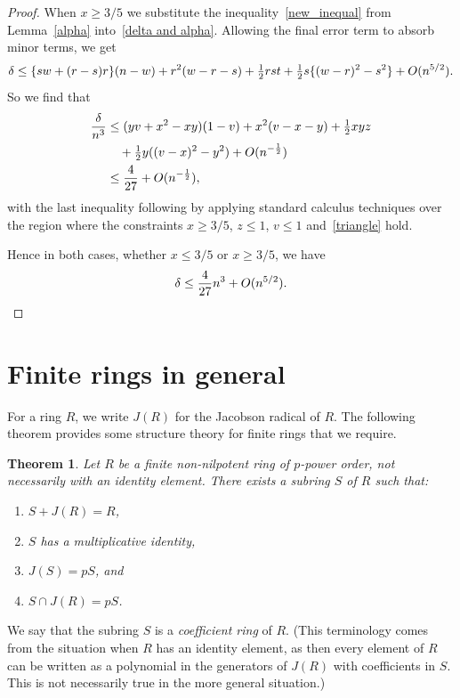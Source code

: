 \documentclass[12pt]{article}
\newtheorem{Thm}{Theorem}[section]
\begin{document}
\begin{proof}
When $x \geq 3/5$ we substitute the inequality~\eqref{new_inequal} from Lemma~\ref{alpha} into~\eqref{delta and alpha}. Allowing the final error term to absorb minor terms, we get
\begin{displaymath}
\delta \leq  \{sw + (r - s)r\}(n - w) + r^{2}(w - r - s) + \tfrac{1}{2}rst + \tfrac{1}{2}s\{(w - r)^{2} - s^{2}\} + \mathnormal{O}(n^{5/2}).
\end{displaymath}
So we find that
\begin{align*}
\frac{\delta}{n^{3}} &\leq (yv + x^{2} - xy)(1 - v) + x^{2}(v - x - y) + \tfrac{1}{2}xyz\\
&\quad + \tfrac{1}{2}y((v - x)^{2} - y^{2}) + \mathnormal{O}(n^{-\frac{1}{2}})\\
&\leq \frac{4}{27}+ \mathnormal{O}(n^{-\frac{1}{2}}),
\end{align*}
with the last inequality following by applying standard calculus techniques over the region where the constraints $x\geq 3/5$, $z\leq 1$, $v\leq 1$ and~\eqref{triangle} hold.

Hence in both cases, whether $x \leq 3/5$ or $x \geq 3/5$, we have 
\begin{displaymath}
\delta \leq \frac{4}{27}n^{3} + \mathnormal{O}(n^{5/2}).\qedhere
\end{displaymath}
\end{proof}

\section{Finite rings in general}
\label{General case}

For a ring $R$, we write $J(R)$ for the Jacobson radical of $R$. The following theorem provides some structure theory for finite rings that we require.
\begin{Thm}
\label{S_exist}
Let $R$ be a finite non-nilpotent ring of $p$-power order, not necessarily with an identity element. There exists a subring $S$ of $R$ such that:
\begin{enumerate}
\item[\textup{(i)}] $S+J(R)=R$,
\item[\textup{(ii)}] $S$ has a multiplicative identity,
\item[\textup{(iii)}] $J(S)=pS$, and
\item[\textup{(iv)}] $S\cap J(R)=pS$.
\end{enumerate}
\end{Thm}

We say that the subring $S$ is a \emph{coefficient ring} of $R$. (This terminology comes from the situation when $R$ has an identity element, as then every element of $R$ can be written as a polynomial in the generators of $J(R)$ with coefficients in $S$. This is not necessarily true in the more general situation.)
\end{document}
